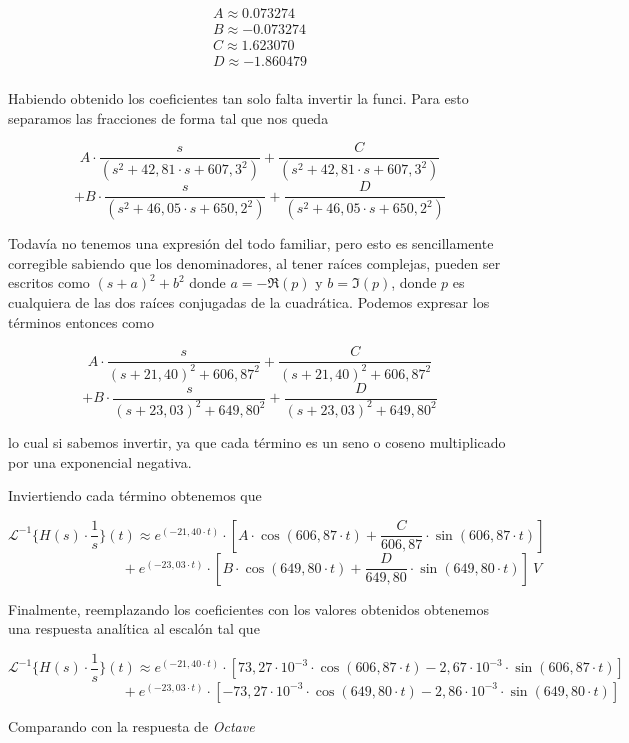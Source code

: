 \documentclass[11pt,a4paper]{report}
\begin{document}
\begin{align*}
A \approx 0.073274\\
B \approx -0.073274\\
C \approx 1.623070\\
D \approx -1.860479\\
\end{align*}

Habiendo obtenido los coeficientes tan solo falta invertir la funci. Para esto separamos las fracciones de forma tal que nos queda

\[A \cdot \frac{s}{(s^2+42,81 \cdot s + 607,3^2)} + \frac{C}{(s^2+42,81 \cdot s + 607,3^2)}\] 
\[+ B \cdot \frac{s}{(s^2+46,05 \cdot s + 650,2^2)} + \frac{D}{(s^2+46,05 \cdot s + 650,2^2)}\]

Todavía no tenemos una expresión del todo familiar, pero esto es sencillamente corregible sabiendo que los denominadores, al tener raíces complejas, pueden ser escritos como $(s+a)^2+b^2$ donde $a = -\Re(p)$ y $b = \Im(p)$, donde $p$ es cualquiera de las dos raíces conjugadas de la cuadrática. Podemos expresar los términos entonces como

\[A \cdot \frac{s}{(s+21,40)^2 + 606,87^2} + \frac{C}{(s+21,40)^2 + 606,87^2}\] 
\[+ B \cdot \frac{s}{(s+23,03)^2 + 649,80^2} + \frac{D}{(s+23,03)^2 + 649,80^2}\]

lo cual si sabemos invertir, ya que cada término es un seno o coseno multiplicado por una exponencial negativa.

\bigskip
Inviertiendo cada término obtenemos que

\[\mathcal{L}^{-1}\{H(s) \cdot \frac{1}{s}\}(t) \approx e^{(-21,40 \cdot t)} \cdot [A \cdot \cos(606,87 \cdot t) + \frac{C}{606,87} \cdot \sin(606,87 \cdot t)]\] 
\[\phantom{asadsdasdasdasda} + e^{(-23,03 \cdot t)} \cdot [B \cdot \cos(649,80 \cdot t) + \frac{D}{649,80} \cdot \sin(649,80 \cdot t)] \ V\]

\bigskip
Finalmente, reemplazando los coeficientes con los valores obtenidos obtenemos una respuesta analítica al escalón tal que

\[\mathcal{L}^{-1}\{H(s) \cdot \frac{1}{s}\}(t) \approx e^{(-21,40 \cdot t)} \cdot [73,27 \cdot 10^{-3} \cdot \cos(606,87 \cdot t) - 2,67 \cdot 10^{-3} \cdot \sin(606,87 \cdot t)]\] 
\[\phantom{asadsdasdasdasda} + e^{(-23,03 \cdot t)} \cdot [-73,27 \cdot 10^{-3} \cdot \cos(649,80 \cdot t) - 2,86 \cdot 10^{-3} \cdot \sin(649,80 \cdot t)]\]

Comparando con la respuesta de \textit{Octave}
\end{document}
